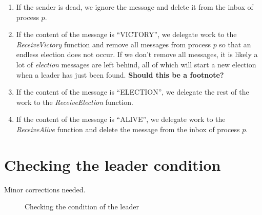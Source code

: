 \documentclass{report}
\newcommand*{\sans}{\fontfamily{lmss}\selectfont}
\begin{document}
\begin{calloutgreen}
\begin{calloutyellow}
\begin{enumerate}[wide, labelwidth=!, labelindent=0pt]
  \item If the sender is dead, we ignore the message and delete it from the inbox of process $p$.
  \item If the content of the message is {\sans ``VICTORY''}, we delegate work to the \textit{ReceiveVictory} function and remove all messages from process $p$ so that an endless election does not occur. If we don't remove all messages, it is likely a lot of \textit{election} messages are left behind, all of which will start a new election when a leader has just been found. \textbf{Should this be a footnote?}
  \item If the content of the message is {\sans ``ELECTION''}, we delegate the rest of the work to the \textit{ReceiveElection} function.
  \item If the content of the message is {\sans ``ALIVE''}, we delegate work to the \textit{ReceiveAlive} function and delete the message from the inbox of process $p$.
\end{enumerate}


\section{Checking the leader condition}

\begin{calloutgreen}
  Minor corrections needed.
  \end{calloutgreen}

\begin{figure}
\tlatex
\@x{}\moduleLeftDash{}\moduleRightDash\@xx{}%
%
%
%
%

\fl{}\bottombar\cl{}

\caption{Checking the condition of the leader}
\label{checkleader}
\end{figure}


\end{calloutyellow}
\end{calloutgreen}
\end{document}
